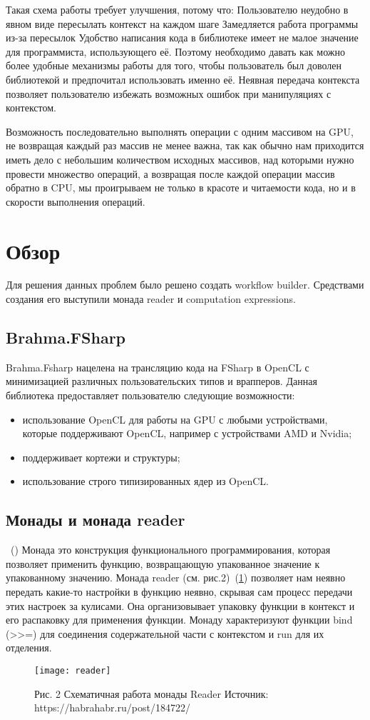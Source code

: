 \documentclass[14pt]{matmex-diploma}
\begin{document}
Такая схема работы требует улучшения, потому что:
Пользователю неудобно в явном виде пересылать контекст на каждом шаге
Замедляется работа программы из-за пересылок
Удобство написания кода в библиотеке имеет не малое значение для программиста, использующего её. Поэтому необходимо давать как можно более удобные механизмы работы для того, чтобы пользователь был доволен библиотекой и предпочитал использовать именно её. Неявная передача контекста позволяет пользователю избежать возможных ошибок при манипуляциях с контекстом.

Возможность последовательно выполнять операции с одним массивом на GPU, не возвращая каждый раз массив не менее важна, так как обычно нам приходится иметь дело с небольшим количеством исходных массивов, над которыми нужно провести множество операций, а возвращая после каждой операции массив обратно в CPU, мы проигрываем не только в красоте и читаемости кода, но и в скорости выполнения операций.


\section{Обзор}
Для решения данных проблем было решено создать workflow builder. Средствами создания его выступили монада reader и computation expressions.
\subsection {Brahma.FSharp}
Brahma.Fsharp нацелена на трансляцию кода на FSharp в OpenCL с минимизацией различных пользовательских типов и врапперов.
Данная библиотека предоставляет пользователю следующие возможности:
\begin{itemize}
\item использование OpenCL для работы на GPU с любыми устройствами, которые поддерживают OpenCL, например с устройствами AMD и Nvidia;
\item поддерживает кортежи и структуры;
\item использование строго типизированных ядер из OpenCL.
\end{itemize}
\subsection {Монады и монада reader}~(\cite{habrahabr})
Монада это конструкция функционального программирования, которая позволяет применить функцию, возвращающую упакованное значение к упакованному значению.
Монада reader (см. рис.2)~(\ref{reader}) позволяет нам неявно передать какие-то настройки в функцию неявно, скрывая сам процесс передачи этих настроек за кулисами. Она организовывает упаковку функции в контекст и его распаковку для применения функции. Монаду характеризуют функции bind (>>=) для соединения содержательной части с контекстом и run для их отделения.
\begin{figure}[h] 
\label{reader}
\centering 
\texttt{[image: reader]} 
\caption{Рис. 2 Схематичная работа монады Reader
Источник: https://habrahabr.ru/post/184722/
} 
\end{figure}
\end{document}
